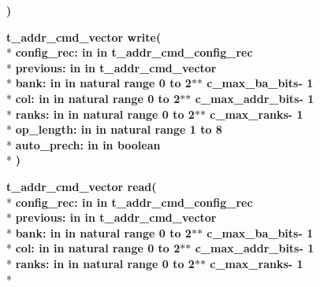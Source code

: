 \begin{DoxyCompactItemize}
{\bfseries  )} 
\item 
{\bfseries {\bfseries {\bfseries {\bf t\+\_\+addr\+\_\+cmd\+\_\+vector}} \textcolor{vhdlchar}{ }}} {\bf write}{\bfseries  ( }\\*
{\bfseries \textcolor{vhdlchar}{config\+\_\+rec\+: }\textcolor{stringliteral}{in }\textcolor{vhdlchar}{in t\+\_\+addr\+\_\+cmd\+\_\+config\+\_\+rec}}\\*
{\bfseries \textcolor{vhdlchar}{previous\+: }\textcolor{stringliteral}{in }\textcolor{vhdlchar}{in t\+\_\+addr\+\_\+cmd\+\_\+vector}}\\*
{\bfseries \textcolor{vhdlchar}{bank\+: }\textcolor{stringliteral}{in }\textcolor{vhdlchar}{in natural   range  0 to  2$\ast$$\ast$   c\+\_\+max\+\_\+ba\+\_\+bits-\/ 1}}\\*
{\bfseries \textcolor{vhdlchar}{col\+: }\textcolor{stringliteral}{in }\textcolor{vhdlchar}{in natural   range  0 to  2$\ast$$\ast$   c\+\_\+max\+\_\+addr\+\_\+bits-\/ 1}}\\*
{\bfseries \textcolor{vhdlchar}{ranks\+: }\textcolor{stringliteral}{in }\textcolor{vhdlchar}{in natural   range  0 to  2$\ast$$\ast$   c\+\_\+max\+\_\+ranks-\/ 1}}\\*
{\bfseries \textcolor{vhdlchar}{op\+\_\+length\+: }\textcolor{stringliteral}{in }\textcolor{vhdlchar}{in natural   range  1 to  8}}\\*
{\bfseries \textcolor{vhdlchar}{auto\+\_\+prech\+: }\textcolor{stringliteral}{in }\textcolor{vhdlchar}{in boolean}}\\*
{\bfseries  )} 
\item 
{\bfseries {\bfseries {\bfseries {\bf t\+\_\+addr\+\_\+cmd\+\_\+vector}} \textcolor{vhdlchar}{ }}} {\bf read}{\bfseries  ( }\\*
{\bfseries \textcolor{vhdlchar}{config\+\_\+rec\+: }\textcolor{stringliteral}{in }\textcolor{vhdlchar}{in t\+\_\+addr\+\_\+cmd\+\_\+config\+\_\+rec}}\\*
{\bfseries \textcolor{vhdlchar}{previous\+: }\textcolor{stringliteral}{in }\textcolor{vhdlchar}{in t\+\_\+addr\+\_\+cmd\+\_\+vector}}\\*
{\bfseries \textcolor{vhdlchar}{bank\+: }\textcolor{stringliteral}{in }\textcolor{vhdlchar}{in natural   range  0 to  2$\ast$$\ast$   c\+\_\+max\+\_\+ba\+\_\+bits-\/ 1}}\\*
{\bfseries \textcolor{vhdlchar}{col\+: }\textcolor{stringliteral}{in }\textcolor{vhdlchar}{in natural   range  0 to  2$\ast$$\ast$   c\+\_\+max\+\_\+addr\+\_\+bits-\/ 1}}\\*
{\bfseries \textcolor{vhdlchar}{ranks\+: }\textcolor{stringliteral}{in }\textcolor{vhdlchar}{in natural   range  0 to  2$\ast$$\ast$   c\+\_\+max\+\_\+ranks-\/ 1}}\\*

\end{DoxyCompactItemize}
